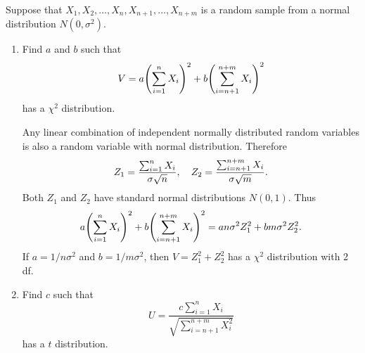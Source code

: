 \documentclass[10pt]{article}
\begin{document}
	\begin{exercise}
		Suppose that $X_1, X_2, \dots, X_n, X_{n+1}, \dots, X_{n+m}$ is a random sample from a normal distribution $N(0, \sigma^2)$.
		\begin{enumerate}
			\item Find $a$ and $b$ such that
			\begin{equation}
				V = a\qty(\sum_{i=1}^n X_i)^2 + b\qty(\sum_{i=n+1}^{n+m} X_i)^2
			\end{equation}
			has a $\chi^2$ distribution.
			\begin{solution}
				Any linear combination of independent normally distributed random variables is also a random variable with normal distribution. Therefore
				\begin{equation}
					Z_1 = \frac{\sum_{i=1}^n X_i}{\sigma \sqrt{n}} \qc Z_2 = \frac{\sum_{i=n+1}^{n+m} X_i}{\sigma \sqrt{m}}.
				\end{equation}
				Both $Z_1$ and $Z_2$ have standard normal distributions $N(0,1)$. Thus
				\begin{equation}
					a\qty(\sum_{i=1}^n X_i)^2 + b\qty(\sum_{i=n+1}^{n+m} X_i)^2 = a n \sigma^2 Z_1^2 + b m \sigma^2 Z_2^2.
				\end{equation}
				If $a = 1/n\sigma^2$ and $b = 1/m\sigma^2$, then $V = Z_1^2 + Z_2^2$ has a $\chi^2$ distribution with 2 df.
			\end{solution}

			\item Find $c$ such that
			\begin{equation}
				U = \frac{c \sum_{i=1}^n X_i}{\sqrt{\sum_{i=n+1}^{n+m} X_i^2}}
			\end{equation}
			has a $t$ distribution.


\end{enumerate}
\end{exercise}
\end{document}
